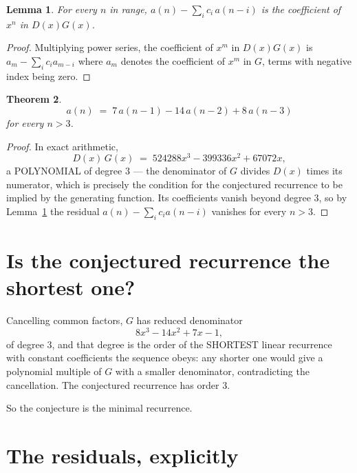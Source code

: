 \documentclass[11pt,a4paper]{article}
\theoremstyle{plain}
\newtheorem{theorem}{Theorem}
\newtheorem{lemma}[theorem]{Lemma}
\theoremstyle{definition}
\begin{document}
\begin{lemma}\label{lem:key}
For every $n$ in range, $a(n)-\sum_i c_i\,a(n-i)$ is the coefficient of $x^{n}$ in
$D(x)G(x)$.
\end{lemma}

\begin{proof}
Multiplying power series, the coefficient of $x^{m}$ in $D(x)G(x)$ is
$a_m-\sum_i c_i a_{m-i}$ where $a_m$ denotes the coefficient of $x^{m}$ in $G$, terms with
negative index being zero.
\end{proof}

\begin{theorem}
\[
a(n)\;=\;7\,a(n-1) - 14\,a(n-2) + 8\,a(n-3)
\]
for every $n>3$.
\end{theorem}

\begin{proof}
In exact arithmetic,
\[
D(x)\,G(x)\;=\;524288 x^{3} - 399336 x^{2} + 67072 x,
\]
a POLYNOMIAL of degree $3$ --- the denominator of $G$ divides $D(x)$ times its numerator,
which is precisely the condition for the conjectured recurrence to be implied by the
generating function. Its coefficients vanish beyond degree $3$, so by
Lemma~\ref{lem:key} the residual $a(n)-\sum_ic_ia(n-i)$ vanishes for every
$n>3$.
\end{proof}

\section{Is the conjectured recurrence the shortest one?}

Cancelling common factors, $G$ has reduced denominator
\[
8 x^{3} - 14 x^{2} + 7 x - 1,
\]
of degree $3$, and that degree is the order of the SHORTEST linear recurrence with
constant coefficients the sequence obeys: any shorter one would give a polynomial multiple of
$G$ with a smaller denominator, contradicting the cancellation. The conjectured recurrence has
order $3$.

So the conjecture is the minimal recurrence.

\section{The residuals, explicitly}
\end{document}
